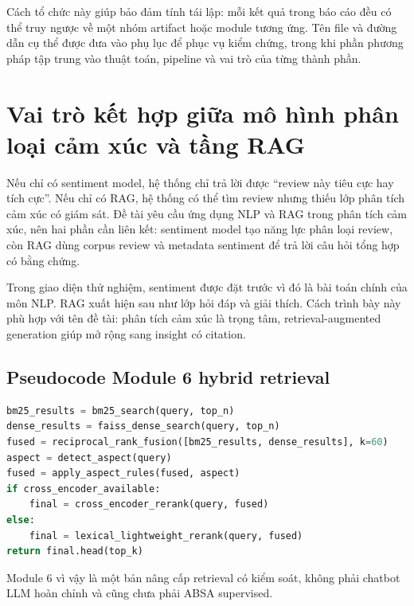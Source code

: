 Cách tổ chức này giúp bảo đảm tính tái lập: mỗi kết quả trong báo cáo đều có thể truy ngược về một nhóm artifact hoặc module tương ứng. Tên file và đường dẫn cụ thể được đưa vào phụ lục để phục vụ kiểm chứng, trong khi phần phương pháp tập trung vào thuật toán, pipeline và vai trò của từng thành phần.

\section{Vai trò kết hợp giữa mô hình phân loại cảm xúc và tầng RAG}
Nếu chỉ có sentiment model, hệ thống chỉ trả lời được “review này tiêu cực hay tích cực”. Nếu chỉ có RAG, hệ thống có thể tìm review nhưng thiếu lớp phân tích cảm xúc có giám sát. Đề tài yêu cầu ứng dụng NLP và RAG trong phân tích cảm xúc, nên hai phần cần liên kết: sentiment model tạo năng lực phân loại review, còn RAG dùng corpus review và metadata sentiment để trả lời câu hỏi tổng hợp có bằng chứng.

Trong giao diện thử nghiệm, sentiment được đặt trước vì đó là bài toán chính của môn NLP. RAG xuất hiện sau như lớp hỏi đáp và giải thích. Cách trình bày này phù hợp với tên đề tài: phân tích cảm xúc là trọng tâm, retrieval-augmented generation giúp mở rộng sang insight có citation.


\subsection{Pseudocode Module 6 hybrid retrieval}
\begin{lstlisting}[language=Python]
bm25_results = bm25_search(query, top_n)
dense_results = faiss_dense_search(query, top_n)
fused = reciprocal_rank_fusion([bm25_results, dense_results], k=60)
aspect = detect_aspect(query)
fused = apply_aspect_rules(fused, aspect)
if cross_encoder_available:
    final = cross_encoder_rerank(query, fused)
else:
    final = lexical_lightweight_rerank(query, fused)
return final.head(top_k)
\end{lstlisting}
Module 6 vì vậy là một bản nâng cấp retrieval có kiểm soát, không phải chatbot LLM hoàn chỉnh và cũng chưa phải ABSA supervised.

